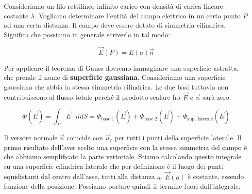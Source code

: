 \begin{figure}[htpb]
\end{figure}
\FloatBarrier

Consideriamo un filo rettilineo infinito carico con densità di carica lineare costante $\lambda$. Vogliamo determinare l'entità del campo elettrico in un certo punto $P$ ad una certa distanza. Il campo deve essere dotato di simmetria cilindrica. Significa che possiamo in generale scriverlo in tal modo:

\[
	\vec{E} (P) = E(a) \vec{n}
\]

Per applicare il teorema di Gauss dovremo immaginare una superficie astratta, che prende il nome di \textbf{superficie gaussiana}.
Consideriamo una superficie gaussiana che abbia la stessa simmetria cilindrica. Le due basi tuttavia non contribuiscono al flusso totale perché il prodotto scalare fra $\vec{E}$ e $\vec{n}$ sarà zero.

\[
	\Phi (\vec{E}) = \int_{\Sigma} \vec{E} \cdot \vec{n} dS = \Phi_{\text{base 1}} (\vec{E}) + \Phi_{\text{base 2}} (\vec{E}) + \Phi_{\text{sup. laterale}} (\vec{E})
\]

Il versore normale $\vec{n}$ coincide con $\vec{u}_r$ per tutti i punti della superficie laterale. Il primo risultato dell'aver scelto una superficie con la stessa simmetria del campo è che abbiamo semplificato la parte vettoriale. Stiamo calcolando questo integrale su una superficie cilindrica laterale che per definizione è il luogo dei punti equidistanti dal centro dall'asse, tutti alla distanza $a$. $\vec{E}(a)$ è costante, essendo funzione della posizione. Possiamo portare quindi il termine fuori dall'integrale.


